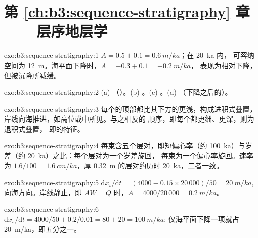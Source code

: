 \section*{第 \ref{ch:b3:sequence-stratigraphy} 章——层序地层学}

\begin{solution}{exo:b3:sequence-stratigraphy:1}
$A = 0.5 + 0.1 = \qty{0.6}{m/ka}$；在 \qty{20}{ka} 内，
可容纳空间为 \qty{12}{m}。海平面下降时，$A = -0.3 + 0.1 = \qty{-0.2}{m/ka}$，
表现为相对下降，但被沉降所减缓。
\end{solution}

\begin{solution}{exo:b3:sequence-stratigraphy:2}
(a) （）。(b) 。(c)
。(d) （下降之后的）。
\end{solution}

\begin{solution}{exo:b3:sequence-stratigraphy:3}
每个的顶部都比其下方的更浅，构成进积式叠置，
岸线向海推进，如高位或中所见。与之相反的
顺序，即每个都更细、更深，则为退积式叠置，
即的特征。
\end{solution}

\begin{solution}{exo:b3:sequence-stratigraphy:4}
每束含五个层对，即短偏心率（约
\qty{100}{ka}）与岁差（约 \qty{20}{ka}）之比：每个层对为一个岁差旋回，
每束为一个偏心率旋回。速率为
$1.6/100 = \qty{1.6}{cm/ka}$，厚 \qty{0.32}{m} 的层对约历时
\qty{20}{ka}，二者一致。
\end{solution}

\begin{solution}{exo:b3:sequence-stratigraphy:5}
$\mathrm dx_s/\mathrm dt = (4000 - 0.15\times20\,000)/50 = \qty{20}{m/ka}$,
向海方向。岸线静止，即 $AW = Q$ 时，$A = 4000/20\,000 =
\qty{0.2}{m/ka}$。
\end{solution}

\begin{solution}{exo:b3:sequence-stratigraphy:6}
$\mathrm dx_s/\mathrm dt = 4000/50 + 0.2/0.01 = 80 + 20 = \qty{100}{m/ka}$;
仅海平面下降一项就占 \qty{20}{m/ka}，即五分之一。
\end{solution}

